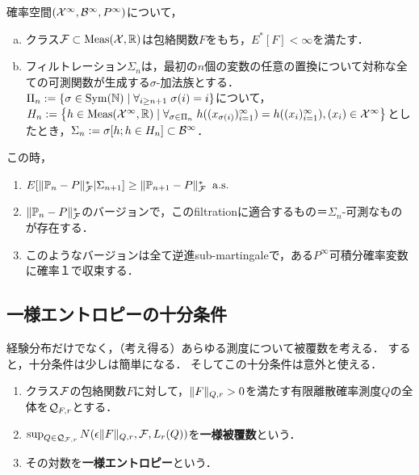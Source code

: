 \documentclass[uplatex,dvipdfmx]{jsreport}
\begin{document}
\begin{lemma}\label{lemma-for-Gilvenko-Cantelli-1}
    確率空間$(\mathcal{X}^\infty,\mathcal{B}^\infty,P^\infty)$について，
    \begin{enumerate}[(a)]
        \item クラス$\mathcal{F}\subset\mathrm{Meas}(\mathcal{X},\mathbb{R})$は包絡関数$F$をもち，$E^*[F]<\infty$を満たす．
        \item フィルトレーション$\Sigma_n$は，最初の$n$個の変数の任意の置換について対称な全ての可測関数が生成する$\sigma$-加法族とする．
        $\Pi_n:=\left\{\sigma\in\mathrm{Sym}(\mathbb{N})\mid\forall_{i\ge n+1}\;\sigma(i)=i\right\}$について，$H_n:=\left\{h\in\mathrm{Meas}(\mathcal{X}^\infty,\mathbb{R})\mid\forall_{\sigma\in\Pi_n}\;h((x_{\sigma(i)})^\infty_{i=1})=h((x_i)_{i=1}^\infty),(x_i)\in\mathcal{X}^\infty\right\}$としたとき，$\Sigma_n:=\sigma[h;h\in H_n]\subset\mathcal{B}^\infty$．
    \end{enumerate}
    この時，
    \begin{enumerate}
        \item $E[\|\mathbb{P}_n-P\|^*_{\mathcal{F}}|\Sigma_{n+1}]\ge\|\mathbb{P}_{n+1}-P\|^*_{\mathcal{F}}\;\;\mathrm{a.s.}$
        \item $\|\mathbb{P}_n-P\|^*_{\mathcal{F}}$のバージョンで，このfiltrationに適合するもの＝$\Sigma_n$-可測なものが存在する．
        \item このようなバージョンは全て逆進sub-martingaleで，ある$P^\infty$可積分確率変数に確率１で収束する．
    \end{enumerate}
\end{lemma}


\subsection{一様エントロピーの十分条件}

\begin{tcolorbox}[colframe=ForestGreen, colback=ForestGreen!10!white,breakable,colbacktitle=ForestGreen!40!white,coltitle=black,fonttitle=\bfseries\sffamily,
title=]
    経験分布だけでなく，（考え得る）あらゆる測度について被覆数を考える．
    すると，十分条件は少しは簡単になる．
    そしてこの十分条件は意外と使える．
\end{tcolorbox}

\begin{definition}\mbox{}
    \begin{enumerate}
        \item クラス$\mathcal{F}$の包絡関数$F$に対して，$\|F\|_{Q,r}>0$を満たす有限離散確率測度$Q$の全体を$\mathcal{Q}_{F,r}$とする．
        \item $\sup_{Q\in\mathcal{Q}_{\mathcal{F},r}}N(\epsilon\|F\|_{Q,r},\mathcal{F},L_r(Q))$を\textbf{一様被覆数}という．
        \item その対数を\textbf{一様エントロピー}という．
    \end{enumerate}
\end{definition}
\end{document}
